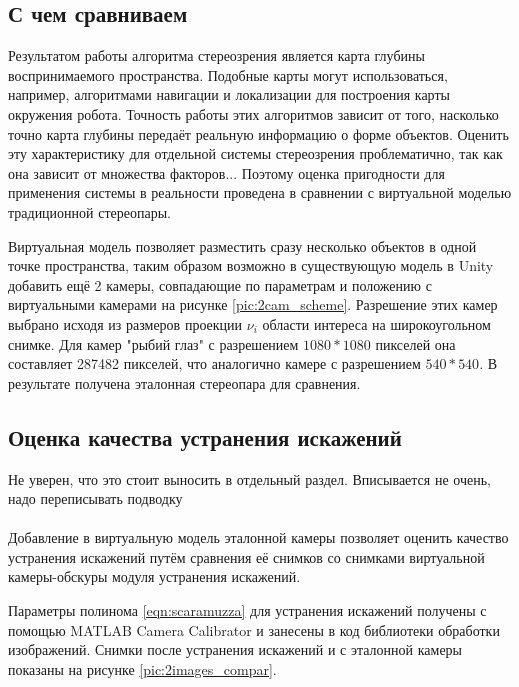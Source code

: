 
\subsection{С чем сравниваем}  %

Результатом работы алгоритма стереозрения является карта глубины воспринимаемого пространства. Подобные карты могут
использоваться, например, алгоритмами навигации и локализации для построения карты окружения робота. Точность работы 
этих алгоритмов зависит от того, насколько точно карта глубины передаёт реальную информацию о форме объектов. Оценить 
эту характеристику для отдельной системы стереозрения проблематично, так как она зависит от множества факторов...
Поэтому оценка пригодности для применения системы в реальности проведена в сравнении с виртуальной моделью традиционной
стереопары.

Виртуальная модель позволяет разместить сразу несколько объектов в одной точке пространства, таким образом возможно
в существующую модель в Unity добавить ещё 2 камеры, совпадающие по параметрам и положению с виртуальными камерами на 
рисунке \ref{pic:2cam_scheme}. Разрешение этих камер выбрано исходя из размеров проекции $\nu_i$ области интереса на широкоугольном
снимке. Для камер "рыбий глаз" с разрешением $1080*1080$ пикселей она составляет 287482 пикселей, что аналогично камере 
с разрешением $540*540$.  В результате получена эталонная стереопара для сравнения. %

\subsection{Оценка качества устранения искажений}

Не уверен, что это стоит выносить в отдельный раздел. Вписывается не очень, надо переписывать подводку
\\
\\
Добавление в виртуальную модель эталонной камеры позволяет оценить качество устранения искажений путём сравнения
её снимков со снимками виртуальной камеры-обскуры модуля устранения искажений. %

Параметры полинома \ref{eqn:scaramuzza} для устранения искажений получены с помощью MATLAB Camera Calibrator и занесены 
в код библиотеки обработки изображений. %
Снимки после устранения искажений и с эталонной камеры показаны на рисунке \ref{pic:2images_compar}.

